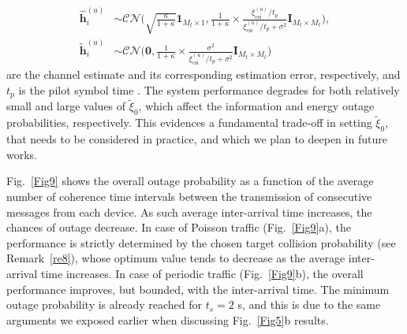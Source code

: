 \documentclass[10pt,journal,a4paper]{IEEEtran}
\begin{document}
		\begin{align}
		\mathbf{\hat{h}}_i^{(u)}\!&\sim \mathcal{CN}\bigg(\sqrt{\frac{\kappa}{1+\kappa}}\mathbf{1}_{M_t\times 1},\frac{1}{1+\kappa}\times\frac{\xi_{\mathrm{csi}}^{(u)}/t_p}{\xi_{\mathrm{csi}}^{(u)}/t_p\!+\!\sigma^2}\mathbf{I}_{M_t\times M_t}\bigg),\nonumber\\
		\mathbf{\tilde{h}}_i^{(u)}\!&\sim\mathcal{CN}\bigg(\mathbf{0},\frac{1}{1+\kappa}\times\frac{\sigma^2}{\xi_{\mathrm{csi}}^{(u)}/t_p+\sigma^2}\mathbf{I}_{M_t\times M_t}\bigg) \nonumber
		\end{align}
%
 are the channel estimate and its corresponding estimation error, respectively, and $t_p$ is the pilot symbol time \cite{LopezFernandez.2018}. The system performance degrades for both relatively small and large values of $\tilde{\xi}_0$, which affect the information and energy outage probabilities, respectively. This evidences a fundamental trade-off in setting $\tilde{\xi}_0$, that needs to be considered in practice, and which we plan to deepen in future works. 
 
		
	
	Fig.~\ref{Fig9} shows the overall outage probability as a function of the average number of coherence time intervals between the transmission of consecutive messages from each device. As such average inter-arrival time increases, the chances of outage decrease. In case of Poisson traffic (Fig.~\ref{Fig9}a), the performance is strictly determined by the chosen target collision  probability (see Remark~\ref{re8}), whose optimum value tends to decrease as the average inter-arrival time increases. In case of periodic traffic (Fig.~\ref{Fig9}b), the overall performance improves, but bounded, with the inter-arrival time. The minimum outage probability is already reached for $t_s=2$ s, and this is due to the same arguments we exposed earlier when discussing Fig.~\ref{Fig5}b results. 
\end{document}
